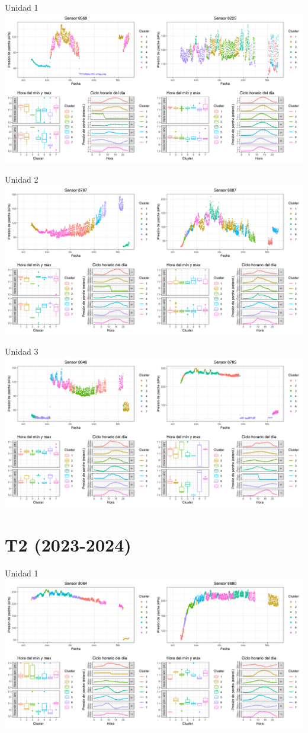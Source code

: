 \documentclass[
  letterpaper,
  DIV=11,
  numbers=noendperiod]{scrreprt}
\begin{document}
Unidad 1
\includegraphics{figuras/01_turgor_sensor/2023_2024_La_Esperanza_T1_Unidad_1.png}

Unidad 2
\includegraphics{figuras/01_turgor_sensor/2023_2024_La_Esperanza_T1_Unidad_2.png}

Unidad 3
\includegraphics{figuras/01_turgor_sensor/2023_2024_La_Esperanza_T1_Unidad_3.png}

\chapter{T2 (2023-2024)}

Unidad 1
\includegraphics{figuras/01_turgor_sensor/2023_2024_La_Esperanza_T2_Unidad_1.png}
\end{document}
